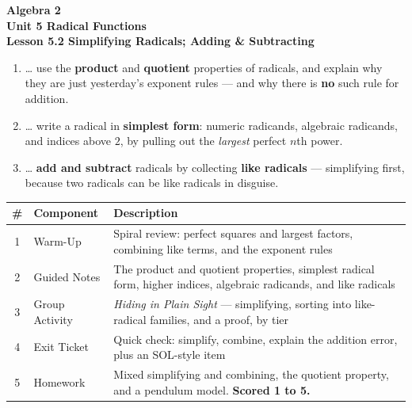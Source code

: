 \documentclass[10pt]{article}
\begin{document}
\vspace{-0.8in}

\begin{center}
  {\color{white}\textbf{\LARGE Algebra 2}}\\[4pt]
  {\color{forestmid}\large\textbf{Unit 5 \quad Radical Functions}}\\[6pt]
  {\color{white}\textbf{\large Lesson 5.2 \quad Simplifying Radicals; Adding \& Subtracting}}
\end{center}

\vspace{0.22in}
\namedateperiod
\vspace{0.18in}

\begin{learningtargetbox}
\small
\begin{enumerate}[leftmargin=1.5em, itemsep=5pt]
  \item \ldots{} use the \textbf{product} and \textbf{quotient} properties of radicals, and explain why they are just yesterday's exponent rules --- and why there is \textbf{no} such rule for addition.
  \item \ldots{} write a radical in \textbf{simplest form}: numeric radicands, algebraic radicands, and indices above $2$, by pulling out the \emph{largest} perfect $n$th power.
  \item \ldots{} \textbf{add and subtract} radicals by collecting \textbf{like radicals} --- simplifying first, because two radicals can be like radicals in disguise.
\end{enumerate}
\end{learningtargetbox}

\vspace{0.14in}

\begin{tocbox}
\small
\renewcommand{\arraystretch}{1.5}
\begin{tabularx}{\linewidth}{@{} c l X @{}}
\rowcolor{forestbg}
\textbf{\#} & \textbf{Component} & \textbf{Description} \\
\midrule
1 & Warm-Up        & Spiral review: perfect squares and largest factors, combining like terms, and the exponent rules \\
2 & Guided Notes   & The product and quotient properties, simplest radical form, higher indices, algebraic radicands, and like radicals \\
3 & Group Activity & \emph{Hiding in Plain Sight} --- simplifying, sorting into like-radical families, and a proof, by tier \\
4 & Exit Ticket    & Quick check: simplify, combine, explain the addition error, plus an SOL-style item \\
5 & Homework       & Mixed simplifying and combining, the quotient property, and a pendulum model. \textbf{Scored 1 to 5.} \\
\end{tabularx}
\end{tocbox}
\end{document}
